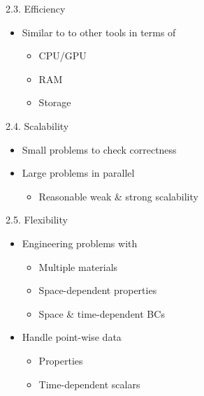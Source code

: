 \documentclass[
  ignorenonframetext,
  aspectratio=169,
]{beamer}
\providecommand{\tightlist}{%
  \setlength{\itemsep}{0pt}\setlength{\parskip}{0pt}}
\begin{document}
\begin{frame}[fragile]{}
\protect\hypertarget{section-7}{}
\begin{columns}[T]
\begin{column}{0.475\textwidth}
\begin{block}{2.3. Efficiency}
\protect\hypertarget{efficiency}{}
\begin{itemize}
\tightlist
\item
  Similar to to other tools in terms of

  \begin{itemize}
  \tightlist
  \item
    CPU/GPU
  \item
    RAM
  \item
    Storage
  \end{itemize}
\end{itemize}
\end{block}

\begin{block}{2.4. Scalability}
\protect\hypertarget{scalability}{}
\begin{itemize}
\tightlist
\item
  Small problems to check correctness
\item
  Large problems in parallel

  \begin{itemize}
  \tightlist
  \item
    Reasonable weak \& strong scalability
  \end{itemize}
\end{itemize}
\end{block}

\begin{block}{2.5. Flexibility}
\protect\hypertarget{flexibility}{}
\begin{itemize}
\tightlist
\item
  Engineering problems with

  \begin{itemize}
  \tightlist
  \item
    Multiple materials
  \item
    Space-dependent properties
  \item
    Space \& time-dependent BCs
  \end{itemize}
\item
  Handle point-wise data

  \begin{itemize}
  \tightlist
  \item
    Properties
  \item
    Time-dependent scalars
  \end{itemize}
\end{itemize}
\end{block}
\end{column}


\end{columns}
\end{frame}
\end{document}
